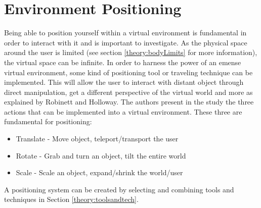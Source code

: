 \section{Environment Positioning}
Being able to position yourself within a virtual environment is fundamental in order to interact with it and is important to investigate.\cite{tools:warren2014perception} As the physical space around the user is limited (see section \ref{theory:bodyLimits} for more information), the virtual space can be infinite. In order to harness the power of an emense virtual environment, some kind of positioning tool or traveling technique can be implemented. This will allow the user to interact with distant object through direct manipulation, get a different perspective of the virtual world and more as explained by Robinett and Holloway. \cite{positioning:Robinett1992} The authors present in the study the three actions that can be implemented into a virtual environment. These three are fundamental for positioning:
\begin{itemize}
  \item Translate - Move object, teleport/transport the user
  \item Rotate - Grab and turn an object, tilt the entire world
  \item Scale - Scale an object, expand/shrink the world/user
\end{itemize}

A positioning system can be created by selecting and combining tools and techniques in Section \ref{theory:toolsandtech}.
